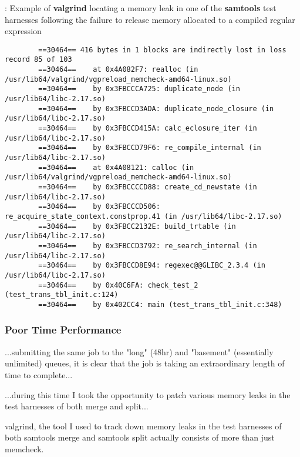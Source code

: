 \begin{listing}[H]
    \caption[valgrind-regex]{: Example of \textbf{valgrind} locating a memory
        leak in one of the \textbf{samtools} test harnesses following the failure
        to release memory allocated to a compiled regular expression}
    \label{list:valgrind-regex}
    \begin{verbatim}
        ==30464== 416 bytes in 1 blocks are indirectly lost in loss record 85 of 103
        ==30464==    at 0x4A082F7: realloc (in /usr/lib64/valgrind/vgpreload_memcheck-amd64-linux.so)
        ==30464==    by 0x3FBCCCA725: duplicate_node (in /usr/lib64/libc-2.17.so)
        ==30464==    by 0x3FBCCD3ADA: duplicate_node_closure (in /usr/lib64/libc-2.17.so)
        ==30464==    by 0x3FBCCD415A: calc_eclosure_iter (in /usr/lib64/libc-2.17.so)
        ==30464==    by 0x3FBCCD79F6: re_compile_internal (in /usr/lib64/libc-2.17.so)
        ==30464==    at 0x4A08121: calloc (in /usr/lib64/valgrind/vgpreload_memcheck-amd64-linux.so)
        ==30464==    by 0x3FBCCCCD88: create_cd_newstate (in /usr/lib64/libc-2.17.so)
        ==30464==    by 0x3FBCCCD506: re_acquire_state_context.constprop.41 (in /usr/lib64/libc-2.17.so)
        ==30464==    by 0x3FBCC2132E: build_trtable (in /usr/lib64/libc-2.17.so)
        ==30464==    by 0x3FBCCD3792: re_search_internal (in /usr/lib64/libc-2.17.so)
        ==30464==    by 0x3FBCCD8E94: regexec@@GLIBC_2.3.4 (in /usr/lib64/libc-2.17.so)
        ==30464==    by 0x40C6FA: check_test_2 (test_trans_tbl_init.c:124)
        ==30464==    by 0x402CC4: main (test_trans_tbl_init.c:348)
    \end{verbatim}
\end{listing}

\subsubsection{Poor Time Performance}
...submitting the same job to the "long" (48hr) and "basement" (essentially
unlimited) queues, it is clear that the job is taking an extraordinary length of
time to complete...

...during this time I took the opportunity to patch various memory leaks in the
test harnesses of both merge and split...

valgrind, the tool I used to track down memory leaks in the test harnesses of
both samtools merge and samtools split actually consists of more than just
memcheck.

